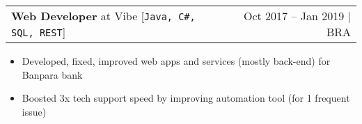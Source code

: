 \documentclass[a4paper,11pt]{article}
\makeatletter
\newcommand{\myHrefIcn}[2]{#2 \href{#1}{\scriptsize{\faExternalLink{}}}}
\newcommand{\resumeItemCustom}[1]{
  \item\small{#1 \vspace{-2pt}}
}
\newcommand{\resumeJobSubheadingD}[7]{
  \vspace{0pt}\item
    \begin{tabular*}{0.97\textwidth}{l@{\extracolsep{\fill}}r}
      \textbf{#4} at \myHrefIcn{#1}{#2} \hspace{3pt} [\small \texttt{#6}] & {\small #5}
    \end{tabular*}\vspace{-6pt}
}
\newcommand{\resumeItemListStart}{\begin{itemize}}
\newcommand{\resumeItemListEnd}{\end{itemize}\vspace{-5pt}}
\newcommand{\csharp}{C\#}
\makeatother
\begin{document}
    \resumeJobSubheadingD
      {http://www.vibedesenv.com/}{Vibe}{Technology for businesses}%
      {Web Developer}{Oct 2017 -- Jan 2019 $\vert$ BRA}
      {Java, \csharp, SQL, REST}%
      {Internet banking web apps, management systems, web services for a state bank \myHrefIcn{http://www.banpara.b.br/}{Banpara}}
      \resumeItemListStart
        \resumeItemCustom{Developed, fixed, improved web apps and services (mostly back-end) for Banpara bank}
        \resumeItemCustom{Boosted 3x tech support speed by improving automation tool (for 1 frequent issue)}
      \resumeItemListEnd

\end{document}
